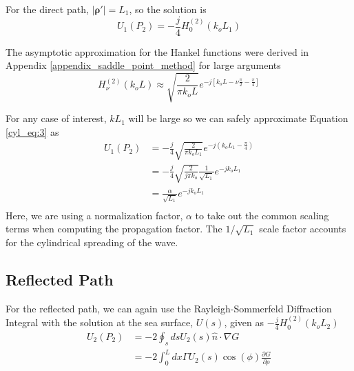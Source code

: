 \noindent For the direct path, $|\boldsymbol{\rho}'| = L_1$, so the  solution is
\begin{equation}
U_1(P_2) =-\frac{j}{4}H_0^{(2)}\left(k_oL_1 \right)
\label{cyl_eq:3}
\end{equation}
\renewcommand{\baselinestretch}{2} \small\normalsize

The asymptotic approximation for the Hankel functions were derived in Appendix \ref{appendix_saddle_point_method} for large arguments
\begin{equation}
H_{\nu}^{(2)}(k_oL) \approx \sqrt{\frac{2}{\pi k_o L}}e^{-j\left[k_oL - \nu\frac{\pi}{2} - \frac{\pi}{4}\right]}
\label{cyl_eq:4}
\end{equation}
\renewcommand{\baselinestretch}{2} \small\normalsize

\noindent For any case of interest, $kL_1$ will be large so we can safely approximate Equation \ref{cyl_eq:3} as
\begin{equation}
\begin{aligned}
U_1(P_2) &=-\frac{j}{4}\sqrt{\frac{2}{\pi k_o L_1}}e^{-j(k_oL_1 - \frac{\pi}{4})}\\
&=-\frac{j}{4}\sqrt{\frac{2}{j\pi k_o}}\frac{1}{\sqrt{L_1}}e^{-jk_oL_1 }\\
&=\frac{\alpha}{\sqrt{L_1}}e^{-jk_oL_1 }\\
\label{cyl_eq:5}
\end{aligned}
\end{equation}
\renewcommand{\baselinestretch}{2} \small\normalsize
Here, we are using a normalization factor, $\alpha$ to take out the common scaling terms when computing the propagation factor. The $1/\sqrt{L_1}$ scale factor accounts for the cylindrical spreading of the wave.

\subsection{Reflected Path}
For the reflected path, we can again use the Rayleigh-Sommerfeld Diffraction Integral with the solution at the sea surface, $U(s)$, given as $-\frac{j}{4}H_0^{(2)}\left(k_oL_2 \right)$
\begin{equation}
\begin{aligned}
U_2(P_2) &= -2\oint_s ds U_2(s)\hat{n}\cdot\nabla G\\
&= -2\int_0^L dx \Gamma U_2(s)\cos(\phi)\frac{\partial G}{\partial \rho}\\
\end{aligned}
\label{cyl_eq:6}
\end{equation}

